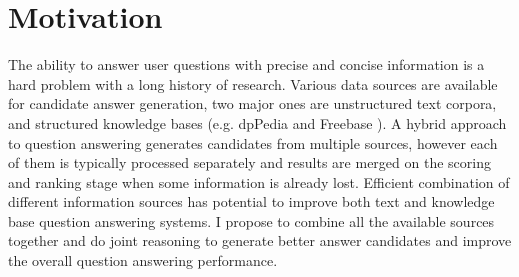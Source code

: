 %
%
\label{chapter:intro}

\setcounter{page}{1}
\pagestyle{myheadings}


\newtheorem{definition}{Definition}
\newtheorem{proposition}{Proposition}


\section{Motivation}




The ability to answer user questions with precise and concise information is a hard problem with a long history of research.
Various data sources are available for candidate answer generation, two major ones are unstructured text corpora, and structured knowledge bases (e.g. dpPedia \cite{auer2007dbpedia} and Freebase \cite{Bollacker:2008:FCC:1376616.1376746}).
A hybrid approach to question answering \cite{baudivs2015modeling,ferrucci2010building} generates candidates from multiple sources, however each of them is typically processed separately and results are merged on the scoring and ranking stage when some information is already lost.
Efficient combination of different information sources has potential to improve both text and knowledge base question answering systems.
I propose to combine all the available sources together and do joint reasoning to generate better answer candidates and improve the overall question answering performance.

